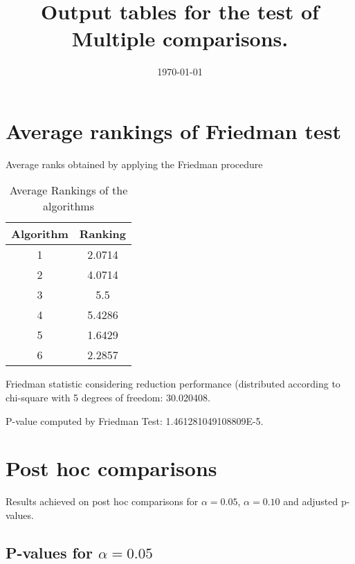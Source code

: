 \documentclass[a4paper,10pt]{article}
\title{Output tables for the test of Multiple comparisons.}
\author{}
\date{\today}
\begin{document}
\begin{landscape}
\pagestyle{empty}
\maketitle
\thispagestyle{empty}
\section{Average rankings of Friedman test}



Average ranks obtained by applying the Friedman procedure

\begin{table}[!htp]
\centering
\begin{tabular}{|c|c|}\hline
Algorithm&Ranking\\\hline
1 & 2.0714\\
2 & 4.0714\\
3 & 5.5\\
4 & 5.4286\\
5 & 1.6429\\
6 & 2.2857\\
\hline
\end{tabular}
\caption{Average Rankings of the algorithms}
\end{table}

Friedman statistic considering reduction performance (distributed according to chi-square with 5 degrees of freedom: 30.020408.

P-value computed by Friedman Test: 1.461281049108809E-5.\newline



\pagebreak

\section{Post hoc comparisons}

Results achieved on post hoc comparisons for $\alpha = 0.05$, $\alpha = 0.10$ and adjusted p-values.

\subsection{P-values for $\alpha=0.05$}


\end{landscape}
\end{document}
